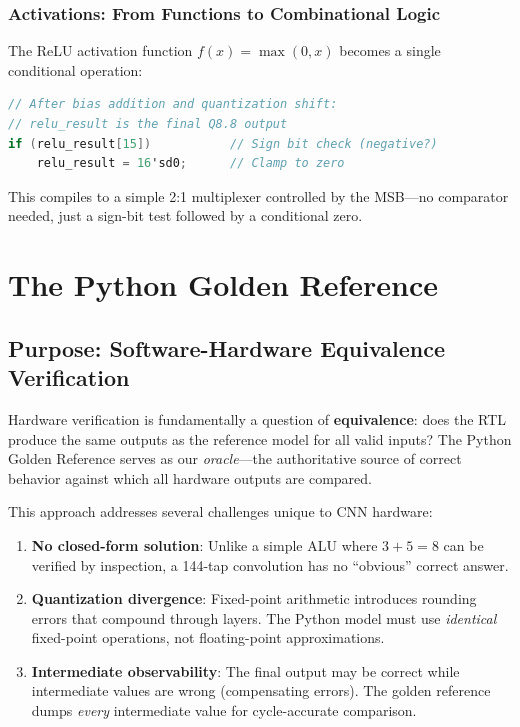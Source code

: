 \documentclass[11pt,a4paper]{report}
\begin{document}
\subsection{Activations: From Functions to Combinational Logic}

The ReLU activation function $f(x) = \max(0, x)$ becomes a single conditional operation:

\begin{lstlisting}[language=Verilog, caption={ReLU implementation via sign-bit inspection}]
// After bias addition and quantization shift:
// relu_result is the final Q8.8 output
if (relu_result[15])           // Sign bit check (negative?)
    relu_result = 16'sd0;      // Clamp to zero
\end{lstlisting}

This compiles to a simple 2:1 multiplexer controlled by the MSB---no comparator needed, just a sign-bit test followed by a conditional zero.


\chapter{The Python Golden Reference}

\section{Purpose: Software-Hardware Equivalence Verification}

Hardware verification is fundamentally a question of \textbf{equivalence}: does the RTL produce the same outputs as the reference model for all valid inputs? The Python Golden Reference serves as our \textit{oracle}---the authoritative source of correct behavior against which all hardware outputs are compared.

This approach addresses several challenges unique to CNN hardware:

\begin{enumerate}[leftmargin=2em]
    \item \textbf{No closed-form solution}: Unlike a simple ALU where $3 + 5 = 8$ can be verified by inspection, a 144-tap convolution has no ``obvious'' correct answer.
    
    \item \textbf{Quantization divergence}: Fixed-point arithmetic introduces rounding errors that compound through layers. The Python model must use \textit{identical} fixed-point operations, not floating-point approximations.
    
    \item \textbf{Intermediate observability}: The final output may be correct while intermediate values are wrong (compensating errors). The golden reference dumps \textit{every} intermediate value for cycle-accurate comparison.
\end{enumerate}
\end{document}
